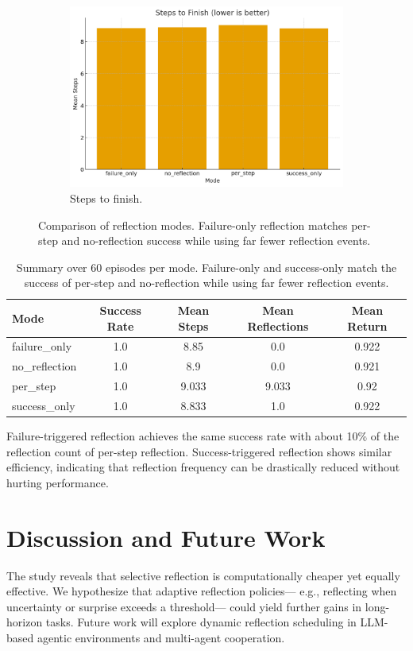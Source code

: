 \documentclass[conference]{IEEEtran}
\begin{document}
\begin{figure}[!t]
\begin{subfigure}{0.48\linewidth}
\includegraphics[width=\linewidth]{plots/reflection_timing_steps.png}
\caption{Steps to finish.}
\end{subfigure}
\caption{Comparison of reflection modes.
Failure-only reflection matches per-step and no-reflection success
while using far fewer reflection events.}
\label{fig:plots}
\end{figure}

\begin{table}[t]
\centering
\caption{Summary over 60 episodes per mode. Failure-only and success-only match the success of per-step and no-reflection while using far fewer reflection events.}
\label{tab:summary}
\begin{tabular}{lcccc}
\toprule
Mode & Success Rate & Mean Steps & Mean Reflections & Mean Return \\
\midrule
failure_only & 1.0 & 8.85 & 0.0 & 0.922 \\
no_reflection & 1.0 & 8.9 & 0.0 & 0.921 \\
per_step & 1.0 & 9.033 & 9.033 & 0.92 \\
success_only & 1.0 & 8.833 & 1.0 & 0.922 \\
\bottomrule
\end{tabular}
\end{table}


Failure-triggered reflection achieves the same success rate
with about 10\% of the reflection count of per-step reflection.
Success-triggered reflection shows similar efficiency,
indicating that reflection frequency can be drastically reduced
without hurting performance.

\section{Discussion and Future Work}
The study reveals that selective reflection
is computationally cheaper yet equally effective.
We hypothesize that adaptive reflection policies---
e.g., reflecting when uncertainty or surprise exceeds a threshold---
could yield further gains in long-horizon tasks.
Future work will explore dynamic reflection scheduling
in LLM-based agentic environments and multi-agent cooperation.
\end{document}
